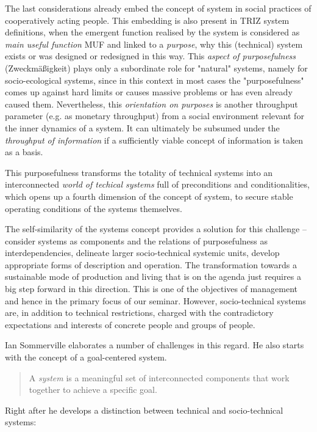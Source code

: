 \documentclass[11pt,a4paper]{article}
\begin{document}
The last considerations already embed the concept of system in social
practices of cooperatively acting people. This embedding is also present in
TRIZ system definitions, when the emergent function realised by the system is
considered as \emph{main useful function} MUF and linked to a \emph{purpose},
why this (technical) system exists or was designed or redesigned in this way.
This \emph{aspect of purposefulness} (Zweckmäßigkeit) plays only a subordinate
role for "natural" systems, namely for socio-ecological systems, since in this
context in most cases the "purposefulness" comes up against hard limits or
causes massive problems or has even already caused them. Nevertheless, this
\emph{orientation on purposes} is another throughput parameter (e.g. as
monetary throughput) from a social environment relevant for the inner dynamics
of a system.  It can ultimately be subsumed under the \emph{throughput of
  information} if a sufficiently viable concept of information is taken as a
basis. 

This purposefulness transforms the totality of technical systems into an
interconnected \emph{world of techical systems} full of preconditions and
conditionalities, which opens up a fourth dimension of the concept of system,
to secure stable operating conditions of the systems themselves.

The self-similarity of the systems concept provides a solution for this
challenge -- consider systems as components and the relations of
purposefulness as interdependencies, delineate larger socio-technical systemic
units, develop appropriate forms of description and operation. The
transformation towards a sustainable mode of production and living that is on
the agenda just requires a big step forward in this direction.  This is one of
the objectives of management and hence in the primary focus of our seminar.
However, socio-technical systems are, in addition to technical restrictions,
charged with the contradictory expectations and interests of concrete people
and groups of people.

Ian Sommerville \cite{Sommerville2015} elaborates a number of challenges in
this regard. He also starts with the concept of a goal-centered system.
\begin{quote}
  A \emph{system} is a meaningful set of interconnected components that work
  together to achieve a specific goal.  \cite{Sommerville2015}
\end{quote}
Right after he develops a distinction between technical and socio-technical
systems:
\end{document}
